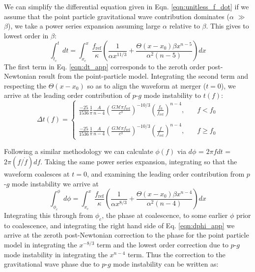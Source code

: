 We can simplify the differential equation given in Eqn. \ref{eqn:unitless_f_dot} if we assume that the point particle gravitational wave contribution dominates ($\alpha$ $\gg$ $\beta$), we take a power series expansion assuming large $\alpha$ relative to $\beta$. This gives to lowest order in $\beta$:
\begin{equation}\label{eqn:dt_app}
\int_{t_c}^t dt = \int_{x_c}^{x} \frac{f_{\mathrm{ref}}}{\kappa} \left (\frac{1}{\alpha x^{11/3}} +  \frac{\Theta(x - x_0) \beta x^{n-5}}{\alpha^2 (n-5)} \right ) dx
\end{equation}
The first term in Eq. \ref{eqn:dt_app} corresponds to the zeroth order post-Newtonian result from the point-particle model. Integrating the second term and respecting the $\Theta(x-x_0)$ so as to align the waveform at merger ($t=0$), we arrive at the leading order contribution of $p$-$g$ mode instability to $t(f)$:
\begin{equation}\label{eqn:t_of_f_app}
\Delta t(f) = \left \{
              \begin{array}{ll}
              \frac{-25}{1536} \frac{1}{\pi} \frac{A}{n-4} \left ( \frac{G \mathcal{M} \pi f_{\mathrm{ref}}}{c^3} \right )^{-10/3}\left ( \frac{f_0}{f_{\mathrm{ref}}} \right )^{n-4}, &\quad   f < f_0 \\ \\
              \frac{-25}{1536} \frac{1}{\pi} \frac{A}{n-4} \left ( \frac{G \mathcal{M} \pi f_{\mathrm{ref}}}{c^3} \right )^{-10/3}\left ( \frac{f}{f_{\mathrm{ref}}} \right )^{n-4}, &\quad  f \ge f_0
              \end{array}
              \right.
\end{equation}

Following a similar methodology we can calculate $\phi(f)$ via $d\phi$ = $2 \pi f dt$ = $2 \pi (f/\dot{f}) df$. Taking the same power series expansion, integrating so that the waveform coalesces at $t = 0$, and examining the leading order contribution from $p$-$g$ mode instability we arrive at
\begin{equation}\label{eqn:dphi_app}
\int_{\phi_c}^\phi d\phi = \int_{x_c}^{x} \frac{f_{\mathrm{ref}}}{\kappa} \left (\frac{1}{\alpha x^{8/3}} +  \frac{\Theta(x - x_0) \beta x^{n-4}}{\alpha^2 (n-4)} \right ) dx
\end{equation}
Integrating this through from $\phi_c$, the phase at coalescence, to some earlier $\phi$ prior to coalescence, and integrating the right hand side of Eq. \ref{eqn:dphi_app} we arrive at the zeroth post-Newtonian correction to the phase for the point particle model in integrating the $x^{-8/3}$ term and the lowest order correction due to $p$-$g$ mode instability in integrating the $x^{n-4}$ term. Thus the correction to the gravitational wave phase due to $p$-$g$ mode instability can be written as:


